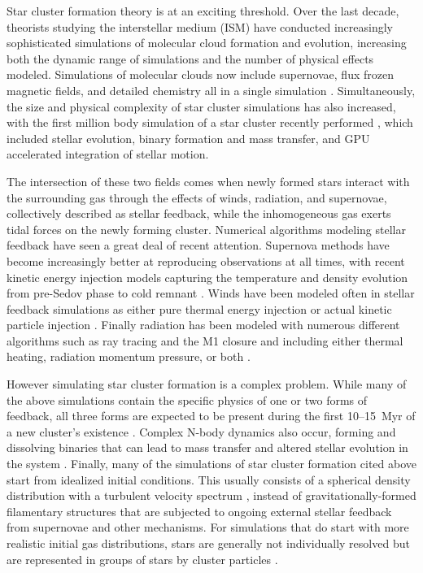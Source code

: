 \documentclass[11pt]{article}
\begin{document}
Star cluster formation theory is at an exciting threshold. Over the last decade, theorists studying the interstellar medium (ISM) have conducted increasingly sophisticated simulations of molecular cloud formation and evolution, increasing both the dynamic range of simulations and the number of physical effects modeled. Simulations of molecular clouds now include supernovae, flux frozen magnetic fields, and detailed chemistry all in a single simulation \citep{Klessen_2000_GasDynTurb,MacLow2004,Joung2006,Hill2012,Ibanez-Mejia2016,haid_supernova-blast_2016,Walch_SILLC1}. Simultaneously, the size and physical complexity of star cluster simulations has also increased, with the first million body simulation of a star cluster recently performed \citep{Dragon_Wang}, which included stellar evolution, binary formation and mass transfer, and GPU accelerated integration of stellar motion. 

The intersection of these two fields comes when newly formed stars interact with the surrounding gas through the effects of winds, radiation, and supernovae, collectively described as stellar feedback, while the inhomogeneous gas exerts tidal forces on the newly forming cluster. Numerical algorithms modeling stellar feedback have seen a great deal of recent attention. Supernova methods have become increasingly better at reproducing observations at all times, with recent kinetic energy injection models capturing the temperature and density evolution from pre-Sedov phase to cold remnant \citep{Simpson2015,Kim_Ostriker_2015ApJ}. Winds have been modeled often in stellar feedback simulations as either pure thermal energy injection or actual kinetic particle injection \citep{Pelupessy_embedded_SC,Dale_winds_2013}. Finally radiation has been modeled with numerous different algorithms such as ray tracing and the M1 closure and including either thermal heating, radiation momentum pressure, or both \citep{Dale_Winds_and_H2,WiseAbel2011,RAMSES-RT,Raskutti_Ostriker_2016}.

However simulating star cluster formation is a complex problem. While many of the above simulations contain the specific physics of one or two forms of feedback, all three forms are expected to be present during the first 10--15~Myr %
of a new cluster's existence \citep{Krumholz2014}. Complex N-body dynamics also occur, forming and dissolving binaries that can lead to mass transfer and altered stellar evolution in the system \citep{PortegiesZwart2007}. Finally, many of the simulations of star cluster formation cited above start from idealized initial conditions. This usually consists of a spherical density distribution with a turbulent velocity spectrum \citep{Dale_Winds_and_H2,Raskutti_Ostriker_2016}, instead of gravitationally-formed filamentary structures \citep{Ibanez-Mejia2016} that are subjected to ongoing external stellar feedback from supernovae \citep{Hill2012} and other mechanisms. For simulations that do start with more realistic initial gas distributions, stars are generally not individually resolved but are represented in groups of stars by cluster particles \citep{Gatto_Walch_SILCC3_2016,dobbs_properties_2016}.
\end{document}
